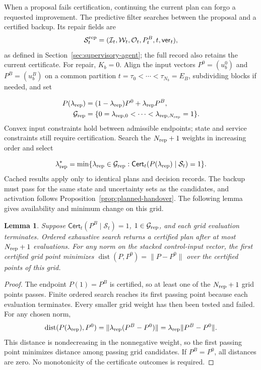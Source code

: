 \documentclass[preprint,12pt]{elsarticle}
\theoremstyle{definition}
\theoremstyle{plain}
\newtheorem{lemma}{Lemma}
\theoremstyle{definition}
\theoremstyle{plain}
\begin{document}
When a proposal fails certification, continuing the current plan can
forgo a requested improvement. The predictive filter
\cite{wabersich2021} searches between the proposal and a certified backup.
Its repair fields are
\[
\mathcal S_t^{\rm rep}=(\mathcal I_t,\mathcal W_t,\mathcal O_t,P_t^B,t,\mathsf{ver}_t),
\]
as defined in Section~\ref{sec:supervisory-agent}; the full record also
retains the current certificate. For repair, $K_b=0$. Align the input
vectors $P^0=(u_b^0)$ and $P^B=(u_b^B)$ on a common partition
$t=\tau_0<\cdots<\tau_{N_b}=E_B$, subdividing blocks if needed, and set

\begin{equation}
\begin{aligned}
P(\lambda_{\rm rep})&=(1-\lambda_{\rm rep})P^0+\lambda_{\rm rep} P^B,\\
\mathcal G_{\rm rep}&=\{0=\lambda_{{\rm rep},0}<\cdots<\lambda_{{\rm rep},N_{\rm rep}}=1\}.
\end{aligned}
\label{eq:repair-family}
\end{equation}
Convex input constraints hold between admissible endpoints; state and
service constraints still require certification. Search the $N_{\rm rep}+1$
weights in increasing order and select

\begin{equation}
\lambda_{\rm rep}^*=\min\{\lambda_{\rm rep}\in\mathcal G_{\rm rep}:
                  \mathsf{Cert}_t(P(\lambda_{\rm rep})\mid\mathcal S_t)=1\}.
\label{eq:repair-selection}
\end{equation}
Cached results apply only to identical plans and decision records.
The backup must pass for the same state and uncertainty sets as the
candidates, and activation follows Proposition~\ref{prop:planned-handover}.
The following lemma gives availability and minimum change on this grid.

\begin{lemma}
\label{thm:repair-grid}
Suppose $\mathsf{Cert}_t(P^B\mid\mathcal S_t)=1$, $1\in\mathcal G_{\rm rep}$, and each
grid evaluation terminates. Ordered exhaustive search returns a certified
plan after at most $N_{\rm rep}+1$ evaluations. For any norm on the stacked
control-input vector, the first certified grid point minimizes
$\operatorname{dist}(P,P^0)=\|P-P^0\|$ over the certified points of this grid.
\end{lemma}

\begin{proof}
The endpoint $P(1)=P^B$ is certified, so at least one of the
$N_{\rm rep}+1$ grid points passes. Finite ordered search reaches its
first passing point because each evaluation terminates. Every smaller
grid weight has then been tested and failed. For any chosen norm,
\[
 \operatorname{dist}(P(\lambda_{\rm rep}),P^0)
 =\|\lambda_{\rm rep}(P^B-P^0)\|
 =\lambda_{\rm rep}\|P^B-P^0\|.
\]
This distance is nondecreasing in the nonnegative weight, so the first
passing point minimizes distance among passing grid candidates. If
$P^B=P^0$, all distances are zero. No monotonicity of the certificate
outcomes is required.
\end{proof}
\end{document}
